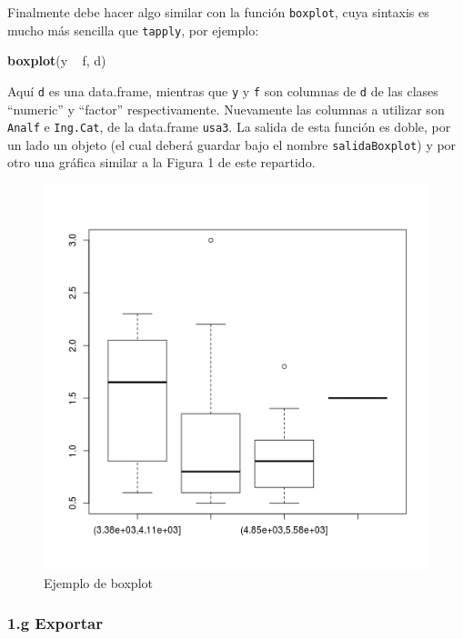 \documentclass[]{article}
\makeatletter
\newenvironment{Shaded}{}{}
\newcommand{\KeywordTok}[1]{\textcolor[rgb]{0.00,0.44,0.13}{\textbf{{#1}}}}
\newcommand{\NormalTok}[1]{{#1}}
\def\maxwidth{\ifdim\Gin@nat@width>\linewidth\linewidth
\else\Gin@nat@width\fi}
\let\Oldincludegraphics\includegraphics
\renewcommand{\includegraphics}[1]{\Oldincludegraphics[width=\maxwidth]{#1}}
\makeatother
\begin{document}
Finalmente debe hacer algo similar con la función \texttt{boxplot}, cuya
sintaxis es mucho más sencilla que \texttt{tapply}, por ejemplo:

\begin{Shaded}
\begin{Highlighting}[]
\KeywordTok{boxplot}\NormalTok{(y ~ f, d)}
\end{Highlighting}
\end{Shaded}
Aquí \texttt{d} es una data.frame, mientras que \texttt{y} y \texttt{f}
son columnas de \texttt{d} de las clases ``numeric'' y ``factor''
respectivamente. Nuevamente las columnas a utilizar son \texttt{Analf} e
\texttt{Ing.Cat}, de la data.frame \texttt{usa3}. La salida de esta
función es doble, por un lado un objeto (el cual deberá guardar bajo el
nombre \texttt{salidaBoxplot}) y por otro una gráfica similar a la
Figura 1 de este repartido.

\begin{figure}[htbp]
\centering
\includegraphics{figure/unnamed-chunk-15.png}
\caption{Ejemplo de boxplot}
\end{figure}

\subsubsection{1.g Exportar}
\end{document}
